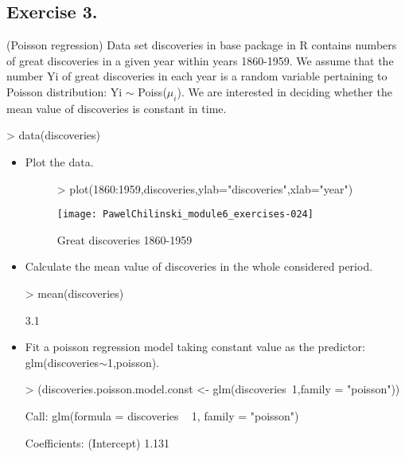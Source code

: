 \documentclass[a4paper]{article}
\begin{document}
\subsection{Exercise 3.} (Poisson regression) Data set discoveries in base package in R contains numbers of great discoveries in a given year within years 1860-1959. 
We assume that the number Yi of great discoveries in each year is a random
variable pertaining to Poisson distribution: Yi $\sim$ Poiss($\mu_i$). We are
interested in deciding whether the mean value of discoveries is constant in time.
\begin{Schunk}
\begin{Sinput}
> data(discoveries)	
\end{Sinput}
\end{Schunk}
\begin{itemize}
\item Plot the data.
\begin{figure}[H]
\begin{center}
\begin{Schunk}
\begin{Sinput}
> plot(1860:1959,discoveries,ylab="discoveries",xlab="year")
\end{Sinput}
\end{Schunk}
\texttt{[image: PawelChilinski\_module6\_exercises-024]}
\caption{Great discoveries 1860-1959}
\end{center}
\end{figure}

\item Calculate the mean value of discoveries in the whole considered period.
\begin{Schunk}
\begin{Sinput}
> mean(discoveries)	
\end{Sinput}
\begin{Soutput}
[1] 3.1
\end{Soutput}
\end{Schunk}
\item Fit a poisson regression model taking constant value as the predictor:
glm(discoveries$\sim$1,poisson).
\begin{Schunk}
\begin{Sinput}
> (discoveries.poisson.model.const <- glm(discoveries~1,family = "poisson"))	
\end{Sinput}
\begin{Soutput}
Call:  glm(formula = discoveries ~ 1, family = "poisson")

Coefficients:
(Intercept)  
      1.131  


\end{Soutput}
\end{Schunk}
\end{itemize}
\end{document}
